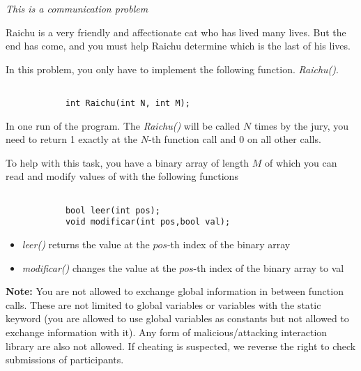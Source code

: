 \documentclass[12pt]{scrartcl}
\begin{document}
    
    {\itshape This is a communication problem}
    
    \vspace{10pt}

        Raichu is a very friendly and affectionate cat who has lived many lives. But the end has come, and you must help Raichu determine which is the last of his lives.

    
       In this problem, you only have to implement the following function.
       {\itshape Raichu()}.
        \begin{verbatim}

            int Raichu(int N, int M);
        \end{verbatim}

        In one run of the program. The {\itshape Raichu()} will be called $N$ times by the jury, you need to return 1 exactly at the $N$-th function call and 0 on all other calls.
        
        To help with this task, you have a binary array of length $M$ of which you can read and modify values of with the following functions
        \begin{verbatim}

            bool leer(int pos);
            void modificar(int pos,bool val);
        \end{verbatim}
        \begin{itemize}
            \item  {\itshape leer()} returns the value at the $pos$-th index of the binary array
            \item {\itshape modificar()} changes the value at the $pos$-th index of the binary array to val
        \end{itemize} 

        \textbf{Note:} You are not allowed to exchange global information in between function calls. These are not limited to global variables or variables with the static keyword (you are allowed to use global variables as constants but not allowed to exchange information with it). Any form of malicious/attacking interaction library are also not allowed. If cheating is suspected, we reverse the right to check submissions of participants.
        \newline

    

\end{document}
